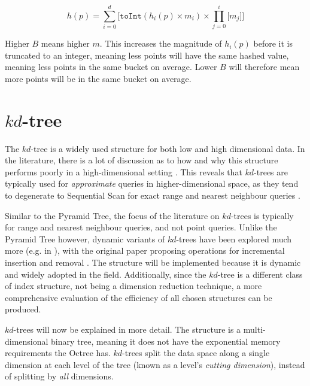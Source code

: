 \begin{equation}
	h(p) = \sum_{i = 0}^{d} { \lbrack \texttt{toInt}( h_i(p) \times m_i ) \times \prod_{j=0}^{i}{\lbrack m_j \rbrack} \rbrack }
	\label{eq:pseudo-pyramid-hash}
\end{equation}

Higher $B$ means higher $m$. This increases the magnitude of $h_i(p)$ before it is truncated to an integer, meaning less points will have the same hashed value, meaning less points in the same bucket on average. Lower $B$ will therefore mean more points will be in the same bucket on average.

\section{$kd$-tree}
\label{sec:kd-tree-detail}

The $kd$-tree is a widely used structure for both low and high dimensional data. In the literature, there is a lot of discussion as to how and why this structure performs poorly in a high-dimensional setting \cite{highd-nn, search-highd-analysis}. This reveals that $kd$-trees are typically used for \textit{approximate} queries in higher-dimensional space, as they tend to degenerate to Sequential Scan for exact range and nearest neighbour queries \cite{similarity-searching}. 

Similar to the Pyramid Tree, the focus of the literature on $kd$-trees is typically for range and nearest neighbour queries, and not point queries. Unlike the Pyramid Tree however, dynamic variants of $kd$-trees have been explored much more (e.g. in \cite{bkd-tree, kdb-tree}), with the original paper proposing operations for incremental insertion and removal \cite{kd-tree}. The structure will be implemented because it is dynamic and widely adopted in the field. Additionally, since the $kd$-tree is a different class of index structure, not being a dimension reduction technique, a more comprehensive evaluation of the efficiency of all chosen structures can be produced.

$kd$-trees will now be explained in more detail. The structure is a multi-dimensional binary tree, meaning it does not have the exponential memory requirements the Octree has. $kd$-trees split the data space along a single dimension at each level of the tree (known as a level's \textit{cutting dimension}), instead of splitting by \textit{all} dimensions.

